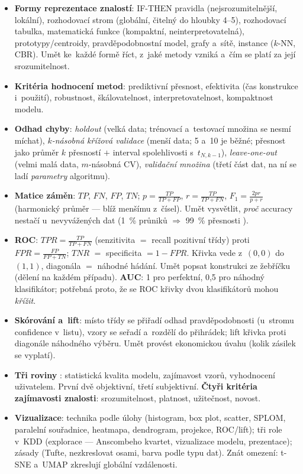 \documentclass[11pt,a4paper]{article}
\theoremstyle{definition}
\begin{document}
\begin{itemize}
\item \textbf{Formy reprezentace znalostí}: IF-THEN pravidla (nejsrozumitelnější, lokální),
      rozhodovací strom (globální, čitelný do hloubky 4--5), rozhodovací tabulka, matematická
      funkce (kompaktní, neinterpretovatelná), prototypy/centroidy, pravděpodobnostní model,
      grafy a~sítě, instance ($k$-NN, CBR). Umět ke~každé formě říct, z~jaké metody vzniká
      a~čím se platí za její srozumitelnost.
\item \textbf{Kritéria hodnocení metod}: prediktivní přesnost, efektivita (čas konstrukce
      i~použití), robustnost, škálovatelnost, interpretovatelnost, kompaktnost modelu.
\item \textbf{Odhad chyby}: \emph{holdout} (velká data; trénovací a~testovací množina se
      nesmí míchat), \emph{$k$-násobná křížová validace} (menší data; 5 a~10 je běžné;
      přesnost jako průměr $k$ přesností $+$ interval spolehlivosti s~$t_{N,k-1}$),
      \emph{leave-one-out} (velmi malá data, $m$-násobná CV), \emph{validační množina} (třetí
      část dat, na ní se ladí \emph{parametry} algoritmu).
\item \textbf{Matice záměn}: $TP$, $FN$, $FP$, $TN$; $p=\frac{TP}{TP+FP}$,
      $r=\frac{TP}{TP+FN}$, $F_1=\frac{2pr}{p+r}$ (harmonický průměr --- blíž menšímu
      z~čísel). Umět vysvětlit, \emph{proč} accuracy nestačí u~nevyvážených dat (1~\% průniků
      $\Rightarrow$ 99~\% přesnosti ).
\item \textbf{ROC}: $\mathit{TPR}=\frac{TP}{TP+FN}$ (senzitivita $=$ recall pozitivní třídy)
      proti $\mathit{FPR}=\frac{FP}{FP+TN}$; $\mathit{TNR}$ $=$ specificita
      $=1-\mathit{FPR}$. Křivka vede z~$(0,0)$ do $(1,1)$, diagonála $=$ náhodné hádání.
      Umět popsat konstrukci ze žebříčku (dělení na každém případu). \textbf{AUC}: 1 pro
      perfektní, 0,5 pro náhodný klasifikátor; potřebná proto, že se ROC křivky dvou
      klasifikátorů mohou \emph{křížit}.
\item \textbf{Skórování a~lift}: místo třídy se přiřadí odhad pravděpodobnosti (u~stromu
      confidence v~listu), vzory se seřadí a~rozdělí do přihrádek; lift křivka proti
      diagonále náhodného výběru. Umět provést ekonomickou úvahu (kolik zásilek se vyplatí).
\item \textbf{Tři roviny }: statistická kvalita modelu, zajímavost vzorů,
      vyhodnocení uživatelem. První dvě objektivní, třetí subjektivní. \textbf{Čtyři kritéria
      zajímavosti znalosti}: srozumitelnost, platnost, užitečnost, novost.
\item \textbf{Vizualizace}: technika podle úlohy (histogram, box plot, scatter, SPLOM,
      paralelní souřadnice, heatmapa, dendrogram, projekce, ROC/lift); tři role v~KDD
      (explorace --- Anscombeho kvartet, vizualizace modelu, prezentace); zásady (Tufte,
      nezkreslovat osami, barva podle typu dat). Znát omezení: t-SNE a~UMAP zkreslují
      globální vzdálenosti.
\end{itemize}
\end{document}
